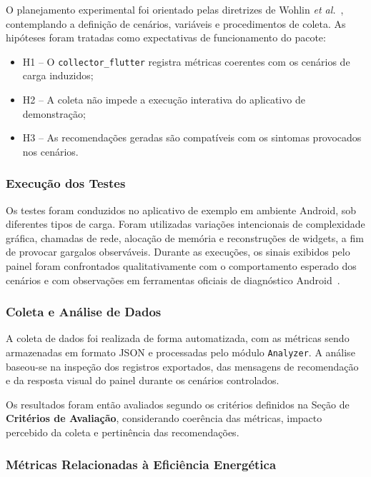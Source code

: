 O planejamento experimental foi orientado pelas diretrizes de Wohlin \textit{et al.}~\cite{wohlin2012}, contemplando a definição de cenários, variáveis e procedimentos de coleta. As hipóteses foram tratadas como expectativas de funcionamento do pacote:

\begin{itemize}
  \item H1 – O \texttt{collector\_flutter} registra métricas coerentes com os cenários de carga induzidos;
  \item H2 – A coleta não impede a execução interativa do aplicativo de demonstração;
  \item H3 – As recomendações geradas são compatíveis com os sintomas provocados nos cenários.
\end{itemize}

\subsubsection{Execução dos Testes}

Os testes foram conduzidos no aplicativo de exemplo em ambiente Android, sob diferentes tipos de carga. Foram utilizadas variações intencionais de complexidade gráfica, chamadas de rede, alocação de memória e reconstruções de widgets, a fim de provocar gargalos observáveis. Durante as execuções, os sinais exibidos pelo painel foram confrontados qualitativamente com o comportamento esperado dos cenários e com observações em ferramentas oficiais de diagnóstico Android~\cite{android2024}.

\subsubsection{Coleta e Análise de Dados}

A coleta de dados foi realizada de forma automatizada, com as métricas sendo armazenadas em formato JSON e processadas pelo módulo \texttt{Analyzer}.
A análise baseou-se na inspeção dos registros exportados, das mensagens de recomendação e da resposta visual do painel durante os cenários controlados.

Os resultados foram então avaliados segundo os critérios definidos na Seção de \textbf{Critérios de Avaliação}, considerando coerência das métricas, impacto percebido da coleta e pertinência das recomendações.

\subsubsection{Métricas Relacionadas à Eficiência Energética}

